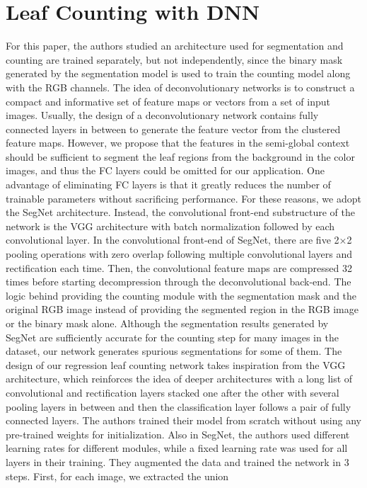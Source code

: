 \section{Leaf Counting with DNN}
For this paper, the authors studied an architecture used for segmentation and counting are trained separately, but not independently, since the binary mask generated by
the segmentation model is used to train the counting model along with the RGB channels. The idea of deconvolutionary networks is to construct a compact and informative
set of feature maps or vectors from a set of input images. Usually, the design of a deconvolutionary network contains fully connected layers in between to generate the
feature vector from the clustered feature maps. However, we propose that the features in the semi-global context should be sufficient to segment the leaf regions from 
the background in the color images, and thus the FC layers could be omitted for our application. One advantage of eliminating FC layers is that it greatly reduces the
number of trainable parameters without sacrificing performance. For these reasons, we adopt the SegNet architecture. Instead, the convolutional front-end substructure
of the network is the VGG architecture with batch normalization followed by each convolutional layer. In the convolutional front-end of SegNet, there are five 2×2 pooling
operations with zero overlap following multiple convolutional layers and rectification each time. Then, the convolutional feature maps are compressed 32 times before
starting decompression through the deconvolutional back-end. The logic behind providing the counting module with the segmentation mask and the original RGB image instead
of providing the segmented region in the RGB image or the binary mask alone. Although the segmentation results generated by SegNet are sufficiently accurate for the
counting step for many images in the dataset, our network generates spurious segmentations for some of them. The design of our regression leaf counting network takes
inspiration from the VGG architecture, which reinforces the idea of deeper architectures with a long list of convolutional and rectification layers stacked one after
the other with several pooling layers in between and then the classification layer follows a pair of fully connected layers. The authors trained their model from
scratch without using any pre-trained weights for initialization. Also in SegNet, the authors used different learning rates for different modules, while a fixed
learning rate was used for all layers in their training. They augmented the data and trained the network in 3 steps. First, for each image, we extracted the union
